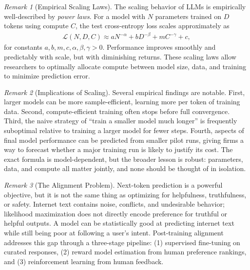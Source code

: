 \documentclass[11pt]{article}
\theoremstyle{definition}
\theoremstyle{plain}
\theoremstyle{remark}
\newtheorem{remark}{Remark}[section]
\begin{document}
\begin{remark}[Empirical Scaling Laws]
    The scaling behavior of LLMs is empirically well-described by \emph{power laws}. For a model with $N$ parameters trained on $D$ tokens using compute $C$, the test cross-entropy loss scales approximately as
    \begin{align}
        \mathcal{L}(N,D,C) \approx aN^{-\alpha} + bD^{-\beta} + mC^{-\gamma} + c,
    \end{align}
    for constants $a, b, m, c, \alpha, \beta, \gamma > 0$. Performance improves smoothly and predictably with scale, but with diminishing returns. These scaling laws allow researchers to optimally allocate compute between model size, data, and training to minimize prediction error.
\end{remark}

\begin{remark}[Implications of Scaling]
    Several empirical findings are notable. First, larger models can be more sample-efficient, learning more per token of training data. Second, compute-efficient training often stops before full convergence. Third, the naive strategy of ``train a smaller model much longer'' is frequently suboptimal relative to training a larger model for fewer steps. Fourth, aspects of final model performance can be predicted from smaller pilot runs, giving firms a way to forecast whether a major training run is likely to justify its cost. The exact formula is model-dependent, but the broader lesson is robust: parameters, data, and compute all matter jointly, and none should be thought of in isolation.
\end{remark}

\begin{remark}[The Alignment Problem]
    Next-token prediction is a powerful objective, but it is not the same thing as optimizing for helpfulness, truthfulness, or safety. Internet text contains noise, conflicts, and undesirable behavior; likelihood maximization does not directly encode preference for truthful or helpful outputs. A model can be statistically good at predicting internet text while still being poor at following a user's intent. Post-training alignment addresses this gap through a three-stage pipeline: (1) supervised fine-tuning on curated responses, (2) reward model estimation from human preference rankings, and (3) reinforcement learning from human feedback.
\end{remark}
\end{document}
